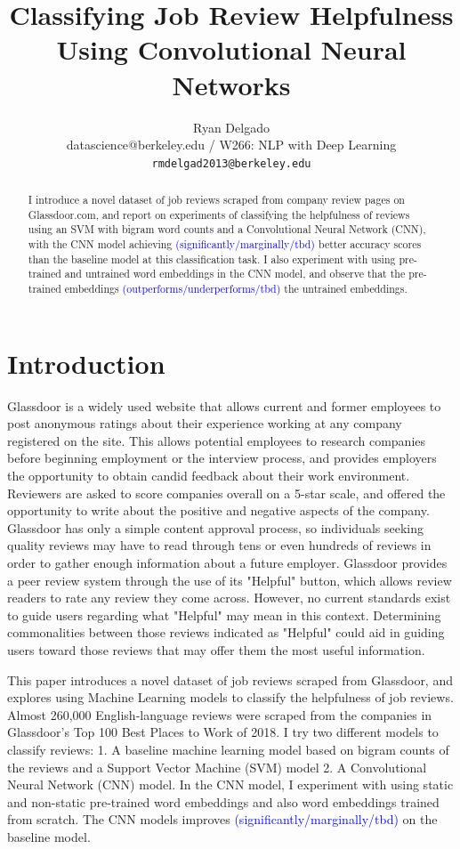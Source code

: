 \documentclass[11pt,a4paper]{article}
\title{Classifying Job Review Helpfulness Using Convolutional Neural Networks}
\author{Ryan Delgado \\
	datascience@berkeley.edu / W266: NLP with Deep Learning \\
	{\tt rmdelgad2013@berkeley.edu}
}
\date{}
\begin{document}
	\maketitle
	\begin{abstract}
	I introduce a novel dataset of job reviews scraped from company review pages on Glassdoor.com, and report on experiments of classifying the helpfulness  of reviews using an SVM with bigram word counts and a Convolutional Neural Network (CNN), with the CNN model achieving \textcolor{blue}{(significantly/marginally/tbd)} better accuracy scores than the baseline model at this classification task. I also experiment with using pre-trained and untrained word embeddings in the CNN model, and observe that the pre-trained embeddings \textcolor{blue}{(outperforms/underperforms/tbd)} the untrained embeddings. 
	\end{abstract}
	
	
	\section{Introduction}
	Glassdoor is a widely used website that allows current and former employees to post anonymous ratings about their experience working at any company registered on the site. This allows potential employees to research companies before beginning employment or the interview process, and provides employers the opportunity to obtain candid feedback about their work environment. Reviewers are asked to score companies overall on a 5-star scale, and offered the opportunity to write about the positive and negative aspects of the company. Glassdoor has only a simple content approval process, so individuals seeking quality reviews may have to read through tens or even hundreds of reviews in order to gather enough information about a future employer. Glassdoor provides a peer review system through the use of its "Helpful" button, which allows review readers to rate any review they come across. However, no current standards exist to guide users regarding what "Helpful" may mean in this context. Determining commonalities between those reviews indicated as "Helpful" could aid in guiding users toward those reviews that may offer them the most useful information.
		
	This paper introduces a novel dataset of job reviews scraped from Glassdoor, and explores using Machine Learning models to classify the helpfulness of job reviews. Almost 260,000 English-language reviews were scraped from the companies in Glassdoor's Top 100 Best Places to Work of 2018. I try two different models to classify reviews: 1. A baseline machine learning model based on bigram counts of the reviews and a Support Vector Machine (SVM) model 2. A Convolutional Neural Network (CNN) model. In the CNN model, I experiment with using static and non-static pre-trained word embeddings and also word embeddings trained from scratch. The CNN models improves \textcolor{blue}{(significantly/marginally/tbd)} on the baseline model.
	
\end{document}
